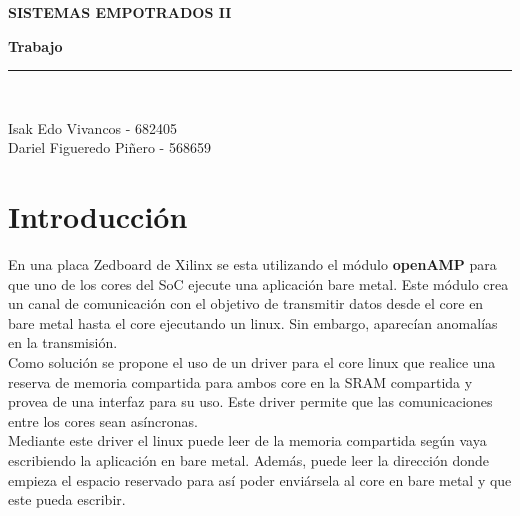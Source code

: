 \documentclass[11pt]{article}
\begin{document}
\begin{titlepage}
\begin{center}

\vspace*{0.15in}
\vspace*{0.6in}
\vspace*{0.2in}
\begin{Large}
\textbf{SISTEMAS EMPOTRADOS II} \\
\end{Large}
\vspace*{0.3in}
\begin{large}
\textbf{Trabajo} \\
\end{large}
\vspace*{0.3in}
\rule{80mm}{0.1mm}\\
\vspace*{0.1in}
\begin{large}
Isak Edo Vivancos - 682405\\
Dariel Figueredo Piñero - 568659\\
\end{large}

\end{center}
\end{titlepage}

\section{Introducción}
En una placa Zedboard de Xilinx se esta utilizando el módulo \textbf{openAMP} para que uno de los cores del SoC ejecute una aplicación bare metal. Este módulo crea un canal de comunicación con el objetivo de transmitir datos desde el core en bare metal hasta el core ejecutando un linux. Sin embargo, aparecían anomalías en la transmisión.\\

\noindent Como solución se propone el uso de un driver para el core linux que realice una reserva de memoria compartida para ambos core en la SRAM compartida y provea de una interfaz para su uso. Este driver permite que las comunicaciones entre los cores sean asíncronas. \\

\noindent Mediante este driver el linux puede leer de la memoria compartida según vaya escribiendo la aplicación en bare metal. Además, puede leer la dirección donde empieza el espacio reservado para así poder enviársela al core en bare metal y que este pueda escribir.   
\end{document}
